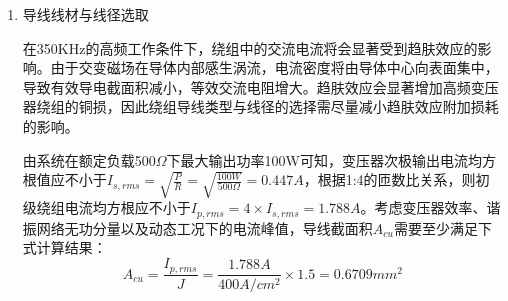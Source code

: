 \begin{enumerate}[topsep = 0 pt, itemsep= 0 pt, parsep=0pt, partopsep=0pt, leftmargin=0pt, itemindent=44pt, labelsep=6pt, listparindent=24pt, label=(\arabic*)]
	      将式(\ref{eq_pt})、式(\ref{eq_kt})和式(\ref{eq_bm})代入式(\ref{eq_ap})中，取窗口利用系数$k_u = 0.2$、绕组电流密度$J = 400A/cm^2$、工作频率$f = 350kHz$，并附加20\%的设计裕量，可得所需面积乘积AP值为：
	      \begin{equation}
		      AP = \frac{P_T}{k_u k_t B_{M} J f}\times 1.2 = \frac{578.57W\times 1.2}{0.2 \times 4 \times 0.27T \times 400A/cm^2 \times 350kHz} \approx 0.1913 cm^4
	      \end{equation}

	      在磁芯选型过程中，本文选用PQ3230型磁芯骨架。根据PQ3230的技术参数，窗口面积$A_w =((27.5-13.45)/2)*(21.3/2)=74.8163mm^2$, 有效截面积$A_e = 153.8 mm^2$，面积乘积为$A_p = A_w A_e = 74.8163mm^2 \times 153.8mm^2 = 1.1507cm^4 > 0.1913 cm^4$。由此可见，PQ3230骨架的面积乘积AP值能够满足设计需求，且具有较大的裕量。较高的面积乘积意味着在相同功率条件下可采用更低的工作磁通密度，从而有效降低单位体积磁芯损耗，减小温升，提高系统效率与长期运行可靠性。

	\item 导线线材与线径选取

	      在350KHz的高频工作条件下，绕组中的交流电流将会显著受到趋肤效应的影响。由于交变磁场在导体内部感生涡流，电流密度将由导体中心向表面集中，导致有效导电截面积减小，等效交流电阻增大。趋肤效应会显著增加高频变压器绕组的铜损，因此绕组导线类型与线径的选择需尽量减小趋肤效应附加损耗的影响。

	      由系统在额定负载500$\Omega$下最大输出功率100W可知，变压器次极输出电流均方根值应不小于$I_{s,rms} = \sqrt{\frac{P}{R}} = \sqrt{\frac{100W}{500\Omega}} = 0.447A$，根据1:4的匝数比关系，则初级绕组电流均方根应不小于$I_{p,rms} = 4 \times I_{s,rms} = 1.788A$。考虑变压器效率、谐振网络无功分量以及动态工况下的电流峰值，导线截面积$A_{cu}$需要至少满足下式计算结果：
	      \begin{equation}
		      A_{cu} = \frac{I_{p,rms}}{J} = \frac{1.788A}{400A/cm^2} \times 1.5 = 0.6709mm^2 \label{eq_wire}
	      \end{equation}


\end{enumerate}
